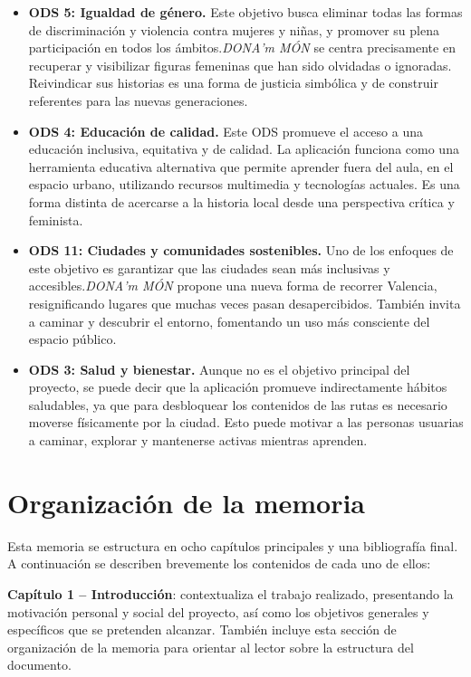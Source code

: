 \begin{itemize}
    \item \textbf{ODS 5: Igualdad de género.} Este objetivo busca eliminar todas las formas de discriminación y violencia contra mujeres y niñas, y promover su plena participación en todos los ámbitos.\textit{DONA'm MÓN} se centra precisamente en recuperar y visibilizar figuras femeninas que han sido olvidadas o ignoradas. Reivindicar sus historias es una forma de justicia simbólica y de construir referentes para las nuevas generaciones.

    \item \textbf{ODS 4: Educación de calidad.} Este ODS promueve el acceso a una educación inclusiva, equitativa y de calidad. La aplicación funciona como una herramienta educativa alternativa que permite aprender fuera del aula, en el espacio urbano, utilizando recursos multimedia y tecnologías actuales. Es una forma distinta de acercarse a la historia local desde una perspectiva crítica y feminista.

    \item \textbf{ODS 11: Ciudades y comunidades sostenibles.} Uno de los enfoques de este objetivo es garantizar que las ciudades sean más inclusivas y accesibles.\textit{DONA'm MÓN} propone una nueva forma de recorrer Valencia, resignificando lugares que muchas veces pasan desapercibidos. También invita a caminar y descubrir el entorno, fomentando un uso más consciente del espacio público.

    \item \textbf{ODS 3: Salud y bienestar.} Aunque no es el objetivo principal del proyecto, se puede decir que la aplicación promueve indirectamente hábitos saludables, ya que para desbloquear los contenidos de las rutas es necesario moverse físicamente por la ciudad. Esto puede motivar a las personas usuarias a caminar, explorar y mantenerse activas mientras aprenden.
\end{itemize}

    
\section{Organización de la memoria}
Esta memoria se estructura en ocho capítulos principales y una bibliografía final. A continuación se describen brevemente los contenidos de cada uno de ellos:

\textbf{Capítulo 1 – Introducción}: contextualiza el trabajo realizado, presentando la motivación personal y social del proyecto, así como los objetivos generales y específicos que se pretenden alcanzar. También incluye esta sección de organización de la memoria para orientar al lector sobre la estructura del documento.

